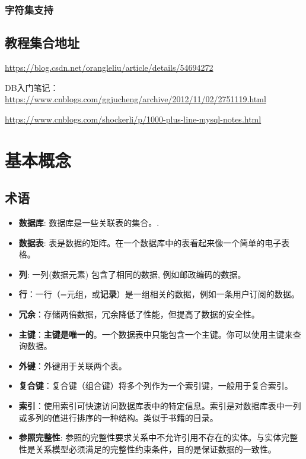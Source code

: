 \documentclass[UTF8,a4paper,12pt]{ctexbook}
\begin{document}
	 	\subsection{字符集支持}
		
		
	 \section{教程集合地址}
	 	\url{https://blog.csdn.net/orangleliu/article/details/54694272}
	 	
	 	DB入门笔记：\url{https://www.cnblogs.com/ggjucheng/archive/2012/11/02/2751119.html}
	 	
	 	\url{https://www.cnblogs.com/shockerli/p/1000-plus-line-mysql-notes.html}
	 	
\chapter{基本概念}
	 \section{术语}
		 \begin{itemize}
		 	\item  \textbf{数据库}: 数据库是一些关联表的集合。.
		 	\item  \textbf{数据表}: 表是数据的矩阵。在一个数据库中的表看起来像一个简单的电子表格。
		 	\item  \textbf{列}: 一列(数据元素) 包含了相同的数据, 例如邮政编码的数据。
		 	\item  \textbf{行}：一行（=元组，或\textbf{记录}）是一组相关的数据，例如一条用户订阅的数据。
		 	\item  \textbf{冗余}：存储两倍数据，冗余降低了性能，但提高了数据的安全性。
		 	\item  \textbf{主键}：\textbf{主键是唯一的}。一个数据表中只能包含一个主键。你可以使用主键来查询数据。
		 	\item  \textbf{外键}：外键用于关联两个表。
		 	\item  \textbf{复合键}：复合键（组合键）将多个列作为一个索引键，一般用于复合索引。
		 	\item  \textbf{索引}：使用索引可快速访问数据库表中的特定信息。索引是对数据库表中一列或多列的值进行排序的一种结构。类似于书籍的目录。
		 	\item  \textbf{参照完整性}: 参照的完整性要求关系中不允许引用不存在的实体。与实体完整性是关系模型必须满足的完整性约束条件，目的是保证数据的一致性。
		 \end{itemize}
		
\end{document}
